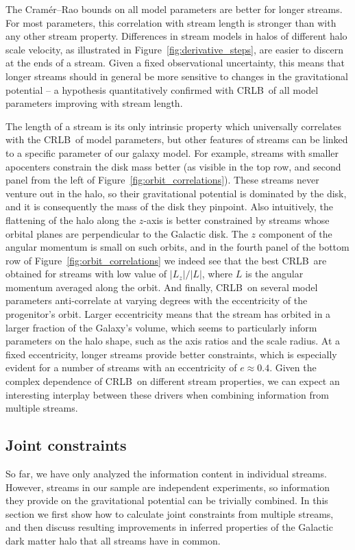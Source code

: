 \documentclass[modern]{aastex62}
\newcommand{\acronym}[1]{{\small{#1}}}
\newcommand{\CRLB}{\acronym{CRLB}}
\begin{document}
The Cram\' er--Rao bounds on all model parameters are better for longer streams.
For most parameters, this correlation with stream length is stronger than with any other stream property.
Differences in stream models in halos of different halo scale velocity, as illustrated in Figure~\ref{fig:derivative_steps}, are easier to discern at the ends of a stream.
Given a fixed observational uncertainty, this means that longer streams should in general be more sensitive to changes in the gravitational potential -- a hypothesis quantitatively confirmed with \CRLB\ of all model parameters improving with stream length.

The length of a stream is its only intrinsic property which universally correlates with the \CRLB\ of model parameters, but other features of streams can be linked to a specific parameter of our galaxy model.
For example, streams with smaller apocenters constrain the disk mass better (as visible in the top row, and second panel from the left of Figure~\ref{fig:orbit_correlations}).
These streams never venture out in the halo, so their gravitational potential is dominated by the disk, and it is consequently the mass of the disk they pinpoint.
Also intuitively, the flattening of the halo along the $z$-axis is better constrained by streams whose orbital planes are perpendicular to the Galactic disk.
The $z$ component of the angular momentum is small on such orbits, and in the fourth panel of the bottom row of Figure~\ref{fig:orbit_correlations} we indeed see that the best \CRLB\ are obtained for streams with low value of $|L_z|/|L|$, where $L$ is the angular momentum averaged along the orbit.
And finally, \CRLB\ on several model parameters anti-correlate at varying degrees with the eccentricity of the progenitor's orbit.
Larger eccentricity means that the stream has orbited in a larger fraction of the Galaxy's volume, which seems to particularly inform parameters on the halo shape, such as the axis ratios and the scale radius.
At a fixed eccentricity, longer streams provide better constraints, which is especially evident for a number of streams with an eccentricity of $e\approx0.4$.
Given the complex dependence of \CRLB\ on different stream properties, we can expect an interesting interplay between these drivers when combining information from multiple streams.

\subsection{Joint constraints}
\label{sec:res_joint}
So far, we have only analyzed the information content in individual streams.
However, streams in our sample are independent experiments, so information they provide on the gravitational potential can be trivially combined.
In this section we first show how to calculate joint constraints from multiple streams, and then discuss resulting improvements in inferred properties of the Galactic dark matter halo that all streams have in common. 
\end{document}
